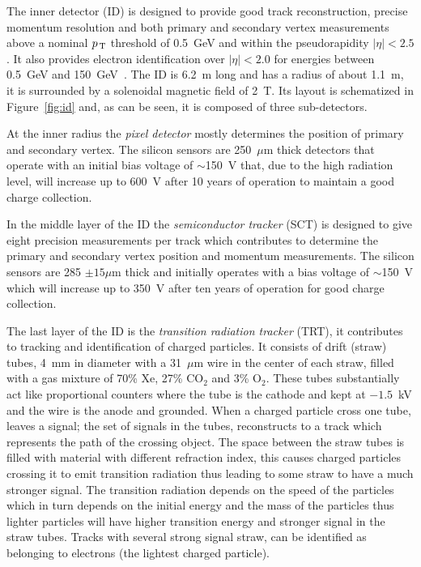 The inner detector (ID) is designed to provide good track reconstruction,
precise momentum resolution and both primary and secondary vertex measurements
above a nominal $p_\mathrm{\, T}$ threshold of 0.5~GeV and within the pseudorapidity
$|\eta| < 2.5$. It also provides electron identification over $|\eta| < 2.0$ for
energies between 0.5~GeV and 150~GeV~\cite{ATLASPaper}. The ID is 6.2~m long and
has a radius of about 1.1~m, it is surrounded by a solenoidal magnetic field of
2~T. Its layout is schematized in Figure~\ref{fig:id} and, as can be seen, it is
composed of three sub-detectors.

At the inner radius the \emph{pixel detector} mostly determines the position of
primary and secondary vertex. The silicon sensors are 250~$\mu$m thick detectors
that operate with an initial bias voltage of $\sim$150~V that, due to the high
radiation level, will increase up to 600~V after 10 years of operation to
maintain a good charge collection.

In the middle layer of the ID the \emph{semiconductor tracker} (SCT) is designed
to give eight precision measurements per track which contributes to determine
the primary and secondary vertex position and momentum measurements. The silicon
sensors are 285 $\pm 15 \mu$m thick and initially operates with a bias voltage
of $\sim$150~V which will increase up to 350~V after ten years of operation for
good charge collection.

The last layer of the ID is the \emph{transition radiation tracker} (TRT), it
contributes to tracking and identification of charged particles. It consists of
drift (straw) tubes, 4~mm in diameter with a 31~$\mu$m wire in the center of
each straw, filled with a gas mixture of 70\% Xe, 27\% CO$_2$ and 3\%
O$_2$. These tubes substantially act like proportional counters where the tube
is the cathode and kept at $- 1.5$~kV and the wire is the anode and
grounded. When a charged particle cross one tube, leaves a signal; the set of
signals in the tubes, reconstructs to a track which represents the path of the
crossing object. The space between the straw tubes is filled with material with
different refraction index, this causes charged particles crossing it to emit
transition radiation thus leading to some straw to have a much stronger
signal. The transition radiation depends on the speed of the particles which in
turn depends on the initial energy and the mass of the particles thus lighter
particles will have higher transition energy and stronger signal in the straw
tubes. Tracks with several strong signal straw, can be identified as belonging
to electrons (the lightest charged particle).

